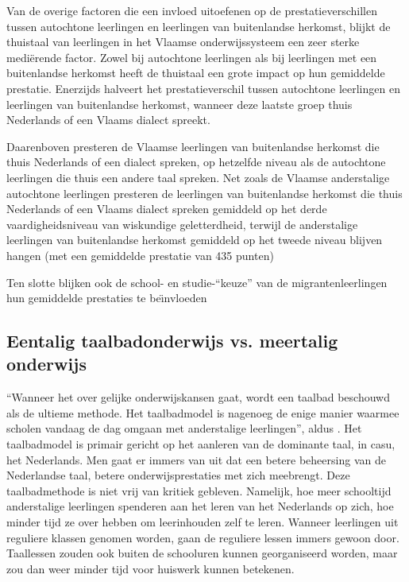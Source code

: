 \documentclass{hogent-article}
\begin{document}
Van de overige factoren die een invloed uitoefenen op de prestatieverschillen tussen autochtone leerlingen en leerlingen van buitenlandse herkomst, blijkt de thuistaal van leerlingen in het Vlaamse onderwijssysteem een zeer sterke medi\"erende factor. Zowel bij autochtone leerlingen als bij leerlingen met een buitenlandse herkomst heeft de thuistaal een grote impact op hun gemiddelde prestatie. Enerzijds halveert het prestatieverschil tussen autochtone leerlingen en leerlingen van buitenlandse herkomst, wanneer deze laatste groep thuis Nederlands of een Vlaams dialect spreekt.

Daarenboven presteren de Vlaamse leerlingen van buitenlandse herkomst die thuis Nederlands of een dialect spreken, op hetzelfde niveau als de autochtone leerlingen die thuis een andere taal spreken. Net zoals de Vlaamse anderstalige autochtone leerlingen presteren de leerlingen van buitenlandse herkomst die thuis Nederlands of een Vlaams dialect spreken gemiddeld op het derde vaardigheidsniveau van wiskundige geletterdheid, terwijl de anderstalige leerlingen van buitenlandse herkomst gemiddeld op het tweede niveau blijven hangen (met een gemiddelde prestatie van 435 punten)

Ten slotte blijken ook de school- en studie-``keuze'' van de migrantenleerlingen hun gemiddelde prestaties te be\"{\i}nvloeden~ %

\subsection*{Eentalig taalbadonderwijs vs. meertalig onderwijs}

\enquote{Wanneer het over gelijke onderwijskansen gaat, wordt een taalbad beschouwd als de ultieme methode. Het taalbadmodel is nagenoeg de enige manier waarmee scholen vandaag de dag omgaan met anderstalige leerlingen}, aldus \textcite{MaartenHermans2010}. Het taalbadmodel is primair gericht op het aanleren van de dominante taal, in casu, het Nederlands. Men gaat er immers van uit dat een betere beheersing van de Nederlandse taal, betere onderwijsprestaties met zich meebrengt. Deze taalbadmethode is niet vrij van kritiek gebleven. Namelijk, hoe meer schooltijd anderstalige leerlingen spenderen aan het leren van het Nederlands op zich, hoe minder tijd ze over hebben om leerinhouden zelf te leren. Wanneer leerlingen uit reguliere klassen genomen worden, gaan de reguliere lessen immers gewoon door. Taallessen zouden ook buiten de schooluren kunnen georganiseerd worden, maar zou dan weer minder tijd voor huiswerk kunnen betekenen.
\end{document}

